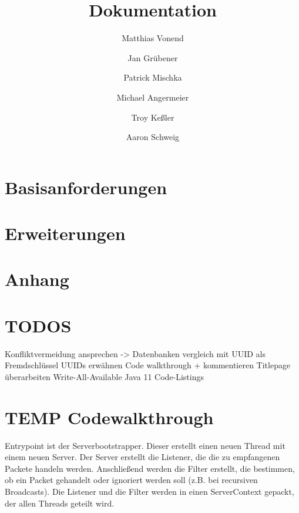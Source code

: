 \documentclass[a4paper]{article}
\title{Dokumentation}
\author{
    Matthias Vonend
    \and
    Jan Grübener
    \and
    Patrick Mischka
    \and
    Michael Angermeier
    \and
    Troy Keßler
    \and
    Aaron Schweig
    \and
}
\theoremstyle{definition}
\begin{document}
    \maketitle
    \tableofcontents

    \vspace{0.2cm}


    \author{}
    \section{Basisanforderungen}
        
    \author{}
    \section{Erweiterungen}
        
    \clearpage
    \author{}
    \section{Anhang}


    \section{TODOS}
        Konfliktvermeidung ansprechen -> Datenbanken vergleich mit UUID als Fremdschlüssel
        UUIDs erwähnen
        Code walkthrough + kommentieren
        Titlepage überarbeiten
        Write-All-Available
        Java 11
        Code-Listings

    \author{}
    \section{TEMP Codewalkthrough}
    Entrypoint ist der Serverbootstrapper. Dieser erstellt einen neuen Thread mit einem neuen Server. Der Server erstellt die Listener, die die zu empfangenen Packete handeln werden. Anschließend werden die Filter erstellt, die bestimmen, ob ein Packet gehandelt oder ignoriert werden soll (z.B. bei recursiven Broadcasts). Die Listener und die Filter werden in einen ServerContext gepackt, der allen Threads geteilt wird.
\end{document}
